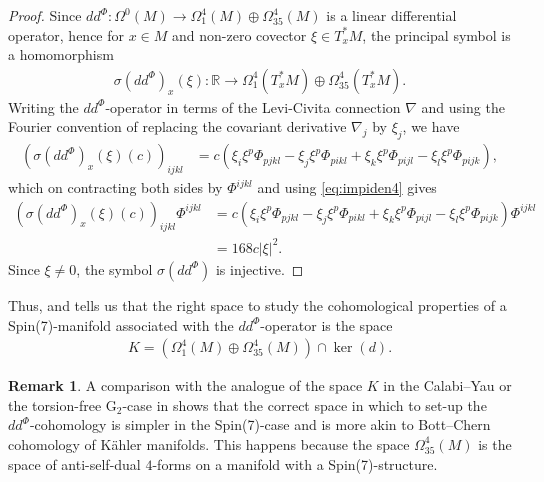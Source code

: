 \documentclass[10pt,a4paper,reqno]{article}
\theoremstyle{definition}
\newtheorem{remark}[theorem]{Remark}
\numberwithin{equation}{section}
\def\bR{\mathbb R}
\def\del{\nabla}
\def\G2{\mathrm{G}_2}
\def\ddphi{dd^{\Phi}}
\begin{document}
\begin{proof}
Since $\ddphi:\Omega^0(M)\rightarrow \Omega^4_1(M)\oplus \Omega^4_{35}(M)$ is a linear differential operator, hence for $x\in M$ and non-zero covector $\xi\in T^*_xM$, the principal symbol is a homomorphism
\begin{align*}
\sigma(\ddphi)_x(\xi): \bR\rightarrow \Omega^4_1(T^*_xM)\oplus \Omega^4_{35}(T^*_xM).
\end{align*}
Writing the $\ddphi$-operator in terms of the Levi-Civita connection $\del$ and using the Fourier convention of replacing the covariant derivative $\del_j$ by $\xi_j$, we have
\begin{align*}
\left(\sigma(\ddphi)_x(\xi)(c)\right)_{ijkl}&=c(\xi_i\xi^p\Phi_{pjkl}-\xi_j\xi^p\Phi_{pikl}+\xi_k\xi^p\Phi_{pijl}-\xi_l\xi^p\Phi_{pijk}),
\end{align*}
which on contracting both sides by $\Phi^{ijkl}$ and using \cref{eq:impiden4} gives
\begin{align*}
\left(\sigma(\ddphi)_x(\xi)(c)\right)_{ijkl}\Phi^{ijkl}&=c(\xi_i\xi^p\Phi_{pjkl}-\xi_j\xi^p\Phi_{pikl}+\xi_k\xi^p\Phi_{pijl}-\xi_l\xi^p\Phi_{pijk})\Phi^{ijkl}\\
&=168c|\xi|^2.
\end{align*}
Since $\xi\neq 0$, the symbol $\sigma(\ddphi)$ is injective.
\end{proof}

Thus,  and  tells us that the right space to study the cohomological properties of a Spin(7)-manifold associated with the $\ddphi$-operator is the space
\begin{align}\label{eq:cohospace}
K= \left(\Omega^4_1(M)\oplus \Omega^4_{35}(M) \right)\cap \ker(d).
\end{align}

\begin{remark}
A comparison with the analogue of the space $K$ in the Calabi--Yau or the torsion-free $\G2$-case in \cite[Def. 6.10, Def. 5.10]{pacini-raferro-pluripotential} shows  that the correct space in which to set-up the $\ddphi$-cohomology is simpler in the Spin(7)-case and is more akin to Bott--Chern cohomology of K\"ahler manifolds. This happens because the space $\Omega^4_{35}(M)$ is the space of anti-self-dual $4$-forms on a manifold with a Spin(7)-structure.
\end{remark}

\end{document}
